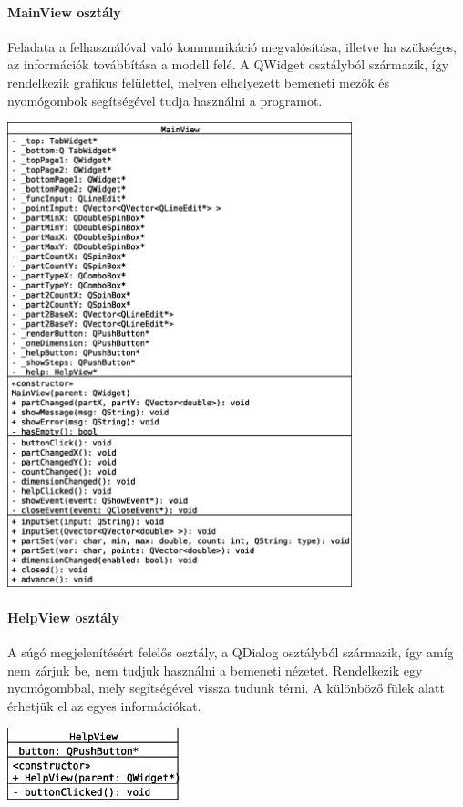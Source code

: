 \documentclass[12pt]{report}
\begin{document}
\paragraph{MainView osztály}
Feladata a felhasználóval való kommunikáció megvalósítása, illetve ha szükséges, az információk továbbítása a modell felé. A QWidget osztályból származik, így rendelkezik grafikus felülettel, melyen elhelyezett bemeneti mezők és nyomógombok segítségével tudja használni a programot.
\begin{center}
\includegraphics[width=10cm]{pics/uml/MainView}
\end{center}

\paragraph{HelpView osztály}
A súgó megjelenítésért felelős osztály, a QDialog osztályból származik, így amíg nem zárjuk be, nem tudjuk használni a bemeneti nézetet. Rendelkezik egy nyomógombbal, mely segítségével vissza tudunk térni. A különböző fülek alatt érhetjük el az egyes információkat.
\begin{center}
\includegraphics[width=5cm]{pics/uml/HelpView}
\end{center}
\end{document}
